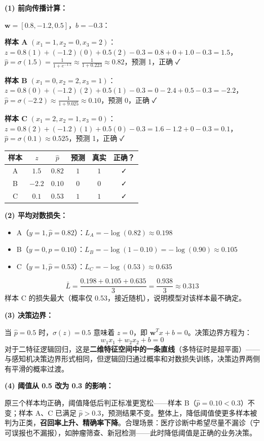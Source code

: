 \documentclass[a4paper,11pt]{ctexart}
\begin{document}
\begin{solutionbox}[参考答案与详细解析]
    \textbf{(1) 前向传播计算：}

    $\boldsymbol{w}=[0.8, -1.2, 0.5]$，$b=-0.3$：

    \textbf{样本 A} $(x_1=1,x_2=0,x_3=2)$：
    $z = 0.8(1) + (-1.2)(0) + 0.5(2) - 0.3 = 0.8+0+1.0-0.3 = 1.5$，
    $\hat{p} = \sigma(1.5) = \frac{1}{1+e^{-1.5}} \approx \frac{1}{1+0.223} \approx 0.82$，预测 1，正确 ✓

    \textbf{样本 B} $(x_1=0,x_2=2,x_3=1)$：
    $z = 0.8(0)+(-1.2)(2)+0.5(1)-0.3 = 0-2.4+0.5-0.3 = -2.2$，
    $\hat{p} = \sigma(-2.2) \approx \frac{1}{1+9.025} \approx 0.10$，预测 0，正确 ✓

    \textbf{样本 C} $(x_1=2,x_2=1,x_3=0)$：
    $z = 0.8(2)+(-1.2)(1)+0.5(0)-0.3 = 1.6-1.2+0-0.3 = 0.1$，
    $\hat{p} = \sigma(0.1) \approx 0.525$，预测 1，正确 ✓

    \begin{center}
    \begin{tabular}{cccccc}
        \toprule
        样本 & $z$ & $\hat{p}$ & 预测 & 真实 & 正确？ \\
        \midrule
        A & $1.5$ & $0.82$ & $1$ & $1$ & ✓ \\
        B & $-2.2$ & $0.10$ & $0$ & $0$ & ✓ \\
        C & $0.1$ & $0.53$ & $1$ & $1$ & ✓ \\
        \bottomrule
    \end{tabular}
    \end{center}

    \textbf{(2) 平均对数损失：}

    \begin{itemize}
        \item A（$y=1, \hat{p}=0.82$）：$L_A = -\log(0.82) \approx 0.198$
        \item B（$y=0, \hat{p}=0.10$）：$L_B = -\log(1-0.10) = -\log(0.90) \approx 0.105$
        \item C（$y=1, \hat{p}=0.53$）：$L_C = -\log(0.53) \approx 0.635$
    \end{itemize}
    \[
    \bar{L} = \frac{0.198+0.105+0.635}{3} = \frac{0.938}{3} \approx \mathbf{0.313}
    \]
    样本 C 的损失最大（概率仅 0.53，接近随机），说明模型对该样本最不确定。

    \textbf{(3) 决策边界：}

    当 $\hat{p} = 0.5$ 时，$\sigma(z)=0.5$ 意味着 $z=0$，即 $\boldsymbol{w}^Tx+b=0$。决策边界方程为：
    \[
    w_1 x_1 + w_2 x_2 + b = 0
    \]
    对于二特征逻辑回归，这是\textbf{二维特征空间中的一条直线}（多特征时是超平面）——与感知机决策边界形式相同，但逻辑回归通过概率和对数损失训练，决策边界两侧有平滑的概率过渡。

    \textbf{(4) 阈值从 0.5 改为 0.3 的影响：}

    原三个样本均正确，阈值降低后判正标准更宽松——样本 B（$\hat{p}=0.10 < 0.3$）不变；样本 A、C 已满足 $\hat{p} > 0.3$，预测结果不变。整体上，降低阈值使更多样本被判为正类，\textbf{召回率上升、精确率下降}。合理场景：医疗诊断中希望尽量不漏诊（宁可误报也不漏报），如肿瘤筛查、新冠检测——此时降低阈值是正确的业务决策。
\end{solutionbox}
\end{document}
